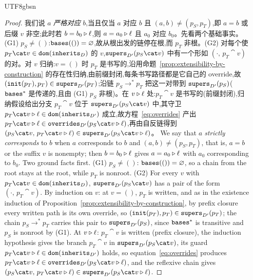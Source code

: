 \begin{CJK*}{UTF8}{gbsn}
\begin{proof}
\ifPaperChinese
我们说 $a$ \emph{严格对应} $b$,当且仅当 $a$ 对应 $b$ 且 $(a, b) \neq (p_S, p_T)$,即 $a = b$ 或后缀 $v$ 非空;此时若 $b = b_0 \mathbin{\triangleright} \ell$,则 $a = a_0 \mathbin{\triangleright} \ell$ 且 $a_0$ 对应 $b_0$。先看两个基础事实。(G1) $p_S \neq ()$:$\mathtt{bases}(()) = \varnothing$,故从根出发的链停在根,而 $p_T$ 非根。(G2) 对每个使 $p_T \cat v \in \dom(\inherits_D)$ 的 $v$,$\supers_{D'}(p_S \cat v)$ 中有一个形如 $(\cdot,\, p_T \cat v)$ 的对。对 $v$ 归纳:$v = ()$ 时 $p_T$ 是书写的,沿用命题~\ref{prop:extensibility-by-construction} 的存在性归纳,由前缀封闭,每条书写路径都是它自己的 override,故 $(\mathtt{init}(p_T), p_T) \in \mathtt{supers}_{D'}(p_T)$;沿链 $p_S \to^* p_T$ 把这一对带到 $\mathtt{supers}_{D'}(p_S)$($\mathtt{bases}^*$ 是传递的,且由 (G1) $p_S$ 非根)。在 $v \mathbin{\triangleright} \ell$ 处:$p_T \cat v$ 是书写的(前缀封闭),归纳假设给出分支 $p_T \cat v$ 位于 $\supers_{D'}(p_S \cat v)$ 中,其守卫 $p_T \cat v \snoc \ell \in \dom(\inherits_{D'})$ 成立,故方程~\eqref{eq:overrides} 产出 $p_T \cat v \snoc \ell \in \overrides_{D'}(p_S \cat v \snoc \ell)$,再由自反链得到 $(p_S \cat v,\, p_T \cat v \snoc \ell) \in \supers_{D'}(p_S \cat v \snoc \ell)$。
\else
We say that $a$ \emph{strictly corresponds} to $b$ when $a$ corresponds to $b$ and
$(a, b) \neq (p_S, p_T)$, that is, $a = b$ or the suffix $v$ is nonempty; then $b = b_0 \mathbin{\triangleright} \ell$
gives $a = a_0 \mathbin{\triangleright} \ell$ with $a_0$ corresponding to $b_0$. Two ground facts first. (G1)
$p_S \neq ()$: $\mathtt{bases}(()) = \varnothing$, so a chain from the root stays at the root, while $p_T$ is
nonroot. (G2) For every $v$ with $p_T \cat v \in \dom(\inherits_D)$, $\supers_{D'}(p_S \cat v)$ has a
pair of the form $(\cdot,\, p_T \cat v)$. By induction on $v$: at $v = ()$, $p_T$ is written, and as in
the existence induction of Proposition~\ref{prop:extensibility-by-construction}, by prefix closure every written path is its
own override, so $(\mathtt{init}(p_T), p_T) \in \mathtt{supers}_{D'}(p_T)$; the chain $p_S \to^* p_T$ carries this pair
to $\mathtt{supers}_{D'}(p_S)$, since $\mathtt{bases}^*$ is transitive and $p_S$ is nonroot by (G1). At $v \mathbin{\triangleright} \ell$:
$p_T \cat v$ is written (prefix closure), the induction hypothesis gives the branch $p_T \cat v$ in
$\supers_{D'}(p_S \cat v)$, its guard $p_T \cat v \snoc \ell \in \dom(\inherits_{D'})$ holds, so
equation~\eqref{eq:overrides} produces $p_T \cat v \snoc \ell \in \overrides_{D'}(p_S \cat v \snoc \ell)$,
and the reflexive chain gives
$(p_S \cat v,\, p_T \cat v \snoc \ell) \in \supers_{D'}(p_S \cat v \snoc \ell)$.
\fi


\end{proof}
\end{CJK*}
